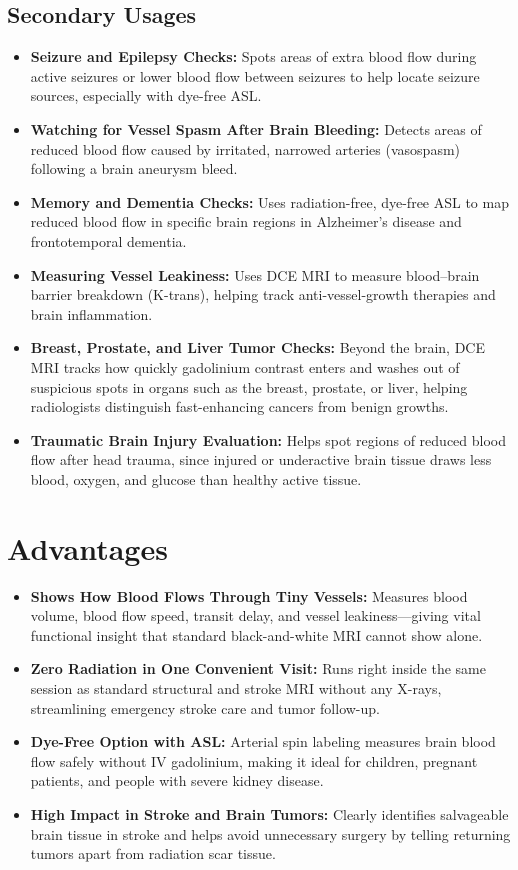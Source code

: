 \subsection{Secondary Usages}

\begin{itemize}
    \item \textbf{Seizure and Epilepsy Checks:} Spots areas of extra blood flow during active seizures or lower blood flow between seizures to help locate seizure sources, especially with dye-free ASL.
    \item \textbf{Watching for Vessel Spasm After Brain Bleeding:} Detects areas of reduced blood flow caused by irritated, narrowed arteries (vasospasm) following a brain aneurysm bleed.
    \item \textbf{Memory and Dementia Checks:} Uses radiation-free, dye-free ASL to map reduced blood flow in specific brain regions in Alzheimer's disease and frontotemporal dementia.
    \item \textbf{Measuring Vessel Leakiness:} Uses DCE MRI to measure blood--brain barrier breakdown (K-trans), helping track anti-vessel-growth therapies and brain inflammation.
    \item \textbf{Breast, Prostate, and Liver Tumor Checks:} Beyond the brain, DCE MRI tracks how quickly gadolinium contrast enters and washes out of suspicious spots in organs such as the breast, prostate, or liver, helping radiologists distinguish fast-enhancing cancers from benign growths.
    \item \textbf{Traumatic Brain Injury Evaluation:} Helps spot regions of reduced blood flow after head trauma, since injured or underactive brain tissue draws less blood, oxygen, and glucose than healthy active tissue.
\end{itemize}

\section{Advantages}

\begin{itemize}
    \item \textbf{Shows How Blood Flows Through Tiny Vessels:} Measures blood volume, blood flow speed, transit delay, and vessel leakiness---giving vital functional insight that standard black-and-white MRI cannot show alone.
    \item \textbf{Zero Radiation in One Convenient Visit:} Runs right inside the same session as standard structural and stroke MRI without any X-rays, streamlining emergency stroke care and tumor follow-up.
    \item \textbf{Dye-Free Option with ASL:} Arterial spin labeling measures brain blood flow safely without IV gadolinium, making it ideal for children, pregnant patients, and people with severe kidney disease.
    \item \textbf{High Impact in Stroke and Brain Tumors:} Clearly identifies salvageable brain tissue in stroke and helps avoid unnecessary surgery by telling returning tumors apart from radiation scar tissue.
\end{itemize}

